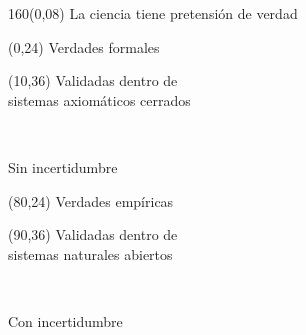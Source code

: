 \documentclass[aspectratio=169,10pt,xcolor=svgnames,compress]{beamer}
\begin{document}
\begin{frame}[plain]
 \begin{textblock}{160}(0,08) \centering
  \Large La ciencia tiene pretensión de verdad
\end{textblock}

 \begin{textblock}{80}(0,24) \centering
 \large Verdades formales 
\end{textblock}

\begin{textblock}{60}(10,36) \centering
 Validadas dentro de \\ sistemas axiomáticos cerrados 
 
 \\[0.2cm]
 
 \centering
 
 Sin incertidumbre
\end{textblock}

\begin{textblock}{80}(80,24) \centering
 \large Verdades empíricas
\end{textblock}

\begin{textblock}{60}(90,36) \centering
 Validadas dentro de \\ sistemas naturales abiertos 
 
 \\[0.2cm]
 
 \centering
 
 Con incertidumbre
\end{textblock}

\end{frame}
\end{document}
